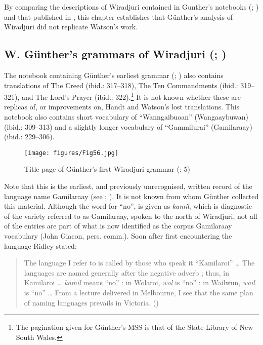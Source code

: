 By comparing the descriptions of Wiradjuri contained in Gunther’s notebooks (\citeyear{gunther_native_1838}; \citeyear{gunther_lecture_1840}) and that published in \citet{hale_languages_1846}, this chapter establishes that Günther’s analysis of Wiradjuri did not replicate Watson’s work. 

\subsection{W. Günther’s grammars of Wiradjuri (\citeyear{gunther_native_1838}; \citeyear{gunther_lecture_1840})}
\label{sec:key:4.1.1}

The notebook containing Günther’s earliest grammar (\citeyear[5--89]{gunther_native_1838}; ) also contains translations of The Creed (ibid.: 317--318), The Ten Commandments (ibid.: 319--321), and The Lord’s Prayer (ibid.: 322).\footnote{The pagination given for Günther’s MSS is that of the State Library of New South Wales.} It is not known whether these are replicas of, or improvements on, Handt and Watson’s lost translations. This notebook also contains short vocabulary of “Wanngaibuoan” (Wangaaybuwan) (ibid.: 309--313) and a slightly longer vocabulary of “Gammilurai” (Gamilaraay) (ibid.: 229--306). 

\begin{figure}[t]
\texttt{[image: figures/Fig56.jpg]}
\caption{Title page of Günther's first Wiradjuri grammar (\citeyear{gunther_native_1838}: 5)}
\label{fig:4:56}
\end{figure}

Note that this is the earliest, and previously unrecognised, written record of the language name Gamilaraay (see \citealt[8--10]{austin_reference_1993}; \citeyear[40]{austin_gamilaraay_2008}). It is not known from whom Günther collected this material. Although the word for ``no'', is given as \textit{kamil}, which is diagnostic of the variety referred to as Gamilaraay, spoken to the north of Wiradjuri, not all of the entries are part of what is now identified as the corpus Gamilaraay vocabulary (John Giacon, pers. comm.). Soon after first encountering the language Ridley stated: 

\begin{quote}
    The language I refer to is called by those who speak it ``Kamilaroi'' … The languages are named generally after the negative adverb ; thus, in Kamilaroi … \textit{kamil} means “no” : in Wolaroi, \textit{wol} is “no” : in Wailwun, \textit{wail} is “no” … From a lecture delivered in Melbourne, I see that the same plan of naming languages prevails in Victoria. (\citealt[73]{ridley_kamilaroi_1855-1})
\end{quote}

